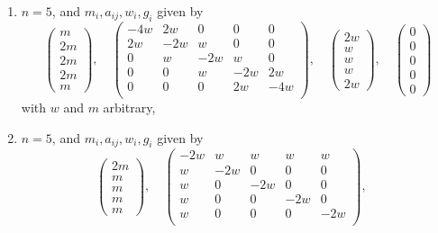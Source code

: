 \begin{lemma}
\begin{enumerate}
$$\begin{matrix}
0 \\
0 \\
0
\end{matrix}
\right)
$$
with $w$ and $m$ arbitrary,
\item
\label{item-down-equal-equal-up}
$n = 5$, and $m_i, a_{ij}, w_i, g_i$ given by
$$
\left(
\begin{matrix}
m \\
2m \\
2m \\
2m \\
m
\end{matrix}
\right),
\quad
\left(
\begin{matrix}
-4w & 2w & 0 & 0 & 0 \\
2w & -2w & w & 0 & 0 \\
0 & w & -2w & w & 0 \\
0 & 0 & w & -2w & 2w \\
0 & 0 & 0 & 2w & -4w \\
\end{matrix}
\right),
\quad
\left(
\begin{matrix}
2w \\
w \\
w \\
w \\
2w
\end{matrix}
\right),
\quad
\left(
\begin{matrix}
0 \\
0 \\
0 \\
0 \\
0
\end{matrix}
\right)
$$
with $w$ and $m$ arbitrary,
\item
\label{item-quadruple}
$n = 5$, and $m_i, a_{ij}, w_i, g_i$ given by
$$
\left(
\begin{matrix}
2m \\
m \\
m \\
m \\
m
\end{matrix}
\right),
\quad
\left(
\begin{matrix}
-2w & w & w & w & w \\
w & -2w & 0 & 0 & 0 \\
w & 0 & -2w & 0 & 0 \\
w & 0 & 0 & -2w & 0 \\
w & 0 & 0 & 0 & -2w \\
\end{matrix}
\right),
\quad
$$
\end{enumerate}
\end{lemma}
